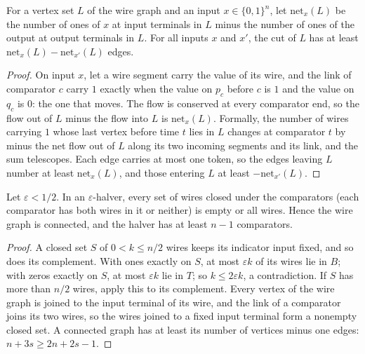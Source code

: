 \begin{lemma}
  \label{lem:lowerbounds-algebraic-halver-tokens}
  \leanok
  For a vertex set $L$ of the wire graph and an input $x\in\{0,1\}^n$, let $\mathrm{net}_x(L)$
  be the number of ones of $x$ at input terminals in $L$ minus the number of ones of the output
  at output terminals in $L$. For all inputs $x$ and $x'$, the cut of $L$ has at least
  $\mathrm{net}_x(L)-\mathrm{net}_{x'}(L)$ edges.
\end{lemma}
\begin{proof}
  \leanok
  On input $x$, let a wire segment carry the value of its wire, and the link of comparator $c$
  carry $1$ exactly when the value on $p_c$ before $c$ is $1$ and the value on $q_c$ is $0$:
  the one that moves. The flow is conserved at every comparator end, so the flow out of $L$
  minus the flow into $L$ is $\mathrm{net}_x(L)$. Formally, the number of wires carrying $1$
  whose last vertex before time $t$ lies in $L$ changes at comparator $t$ by minus the net flow
  out of $L$ along its two incoming segments and its link, and the sum telescopes. Each edge
  carries at most one token, so the edges leaving $L$ number at least $\mathrm{net}_x(L)$, and
  those entering $L$ at least $-\mathrm{net}_{x'}(L)$.
\end{proof}

\begin{lemma}
  \label{lem:lowerbounds-algebraic-halver-connected}
  \leanok
  Let $\varepsilon<1/2$. In an $\varepsilon$-halver, every set of wires closed under the
  comparators (each comparator has both wires in it or neither) is empty or all wires. Hence
  the wire graph is connected, and the halver has at least $n-1$ comparators.
\end{lemma}
\begin{proof}
  \leanok
  A closed set $S$ of $0<k\le n/2$ wires keeps its indicator input fixed, and so does its
  complement. With ones exactly on $S$, at most $\varepsilon k$ of its wires lie in $B$; with
  zeros exactly on $S$, at most $\varepsilon k$ lie in $T$; so $k\le2\varepsilon k$, a
  contradiction. If $S$ has more than $n/2$ wires, apply this to its complement. Every vertex of
  the wire graph is joined to the input terminal of its wire, and the link of a comparator
  joins its two wires, so the wires joined to a fixed input terminal form a nonempty closed set.
  A connected graph has at least its number of vertices minus one edges:
  $n+3s\ge2n+2s-1$.
\end{proof}

